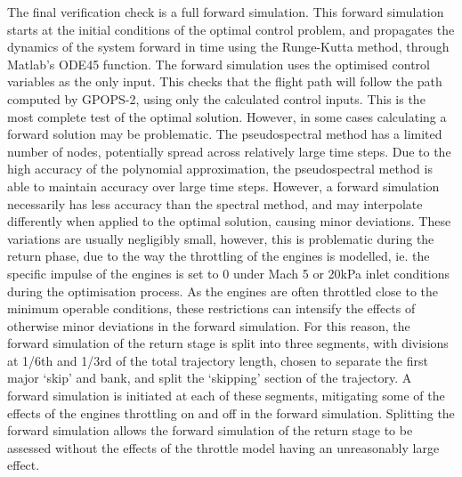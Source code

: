 The final verification check is a full forward simulation. This forward simulation starts at the initial conditions of the optimal control problem, and propagates the dynamics of the system forward in time using the Runge-Kutta method, through Matlab's ODE45 function. The forward simulation uses the optimised control variables as the only input. 
This checks that the flight path will follow the path computed by GPOPS-2, using only the calculated control inputs. This is the most complete test of the optimal solution. However, in some cases calculating a forward solution may be problematic. The pseudospectral method has a limited number of nodes, potentially spread across relatively large time steps. Due to the high accuracy of the polynomial approximation, the pseudospectral method is able to maintain accuracy over large time steps\cite{Ross2004,Darby2011a}. However, a forward simulation necessarily has less accuracy than the spectral method, and may interpolate differently when applied to the optimal solution, causing minor deviations. These variations are usually negligibly small, however, this is problematic during the return phase, due to the way the throttling of the engines is modelled, ie. the specific impulse of the engines is set to 0 under Mach 5 or 20kPa inlet conditions during the optimisation process. As the engines are often throttled close to the minimum operable conditions, these restrictions can intensify the effects of otherwise minor deviations in the forward simulation.
 For this reason, the forward simulation of the return stage is split into three segments, with divisions at 1/6th and 1/3rd of the total trajectory length, chosen to separate the first major `skip' and bank, and split the `skipping' section of the trajectory. A forward simulation is initiated at each of these segments, mitigating some of the effects of the engines throttling on and off in the forward simulation. 
Splitting the forward simulation allows the forward simulation of the return stage to be assessed without the effects of the throttle model having an unreasonably large effect. 


